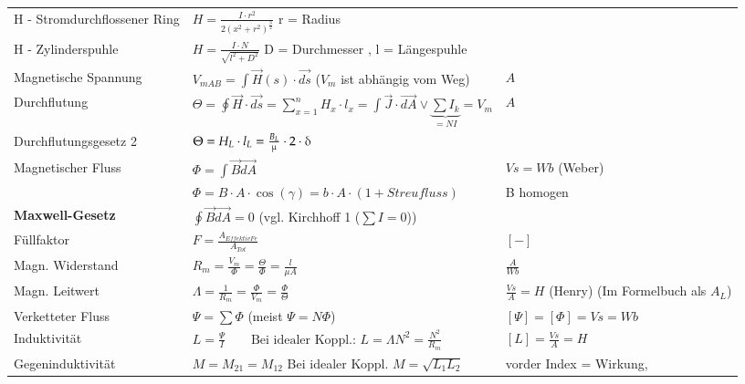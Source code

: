 \begin{tabular}[c]{ | p{5cm} | p{8cm} | p{4cm} | }
            H - Stromdurchflossener Ring & $ H =  \frac{I \cdot r^2}{2(x^2+r^2)^{\frac{3}{2}}}$ \qquad r = Radius &  \\
            H - Zylinderspuhle & $ H = \frac{I \cdot N}{\sqrt{l^2 + D^2}}$ \quad D = Durchmesser , l = Längespuhle & \\
            Magnetische Spannung &
            $V_{mAB} = \int\limits \vec{H}(s) \cdot \vec{ds}$ ($V_m$ ist abhängig vom Weg) &
            $A$ \\
            \hline
            Durchflutung &
            $\Theta = \oint\vec{H} \cdot \vec{ds} = \sum\limits_{x=1}^n H_x \cdot l_x = \int\limits \vec{J} \cdot \vec{dA} \vee \underbrace{\sum I_k}_{= N I} = V_m$ &
            $A$ \\
            \hline
            Durchflutungsgesetz 2 & $\Theta = H_L \cdot l_L = \frac{B_L}{\muup} \cdot 2 \cdot \deltaup $ & \\ \hline
            Magnetischer Fluss &
            $\Phi = \int \vec{B} \vec{dA}$ &
            $Vs = Wb$ (Weber) \\
            &
            $\Phi = B \cdot A \cdot \cos(\gamma)=b \cdot A \cdot (1+Streufluss)$ &
            B homogen \\
            \hline
            \textbf{Maxwell-Gesetz} &
            $\oint \vec{B} \vec{dA} = 0$ (vgl. Kirchhoff 1 ($\sum I = 0$)) &
            \\
            \hline
            Füllfaktor &
            $F=\frac{A_{Effektiv Fe}}{A_{Tot}}$ &
            $[-]$ \\
            \hline
            Magn. Widerstand &
            $R_m = \frac{V_m}{\Phi} = \frac{\Theta}{\Phi} = \frac{l}{\mu A} $ &
            $\frac{A}{Wb}$ \\
            \hline
            Magn. Leitwert &
            $\Lambda = \frac{1}{R_m} = \frac{\Phi}{V_m}=\frac{\Phi}{\Theta}$ &
            $\frac{Vs}{A} = H$ (Henry) (Im Formelbuch als $A_L$) \\
            \hline
            Verketteter Fluss &
            $\Psi = \sum \Phi $ (meist $\Psi = N \Phi$) &
            $[\Psi] = [\Phi] = Vs = Wb$ \\
            \hline
            Induktivität &
            $L = \frac{\Psi}{I}  \qquad \text{Bei idealer Koppl.: } L = \Lambda N^2 = \frac{N^2}{R_m} $ &
            $[L] = \frac{Vs}{A} = H$ \\
            \hline
            Gegeninduktivität &
            $M = M_{21} = M_{12}$ Bei idealer Koppl. $M = \sqrt{L_1 L_2}$ &
            vorder Index = Wirkung, \\

\end{tabular}
